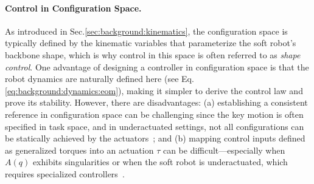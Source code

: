 \paragraph{Control in Configuration Space.}
As introduced in Sec.\ref{sec:background:kinematics}, the configuration space is typically defined by the kinematic variables that parameterize the soft robot’s backbone shape, which is why control in this space is often referred to as \emph{shape control}. One advantage of designing a controller in configuration space is that the robot dynamics are naturally defined here (see Eq.\ref{eq:background:dynamics:eom}), making it simpler to derive the control law and prove its stability. However, there are disadvantages: (a) establishing a consistent reference in configuration space can be challenging since the key motion is often specified in task space, and in underactuated settings, not all configurations can be statically achieved by the actuators~\citep{della2025pushing}; and (b) mapping control inputs defined as generalized torques into an actuation $\tau$ can be difficult—especially when $A(q)$ exhibits singularities or when the soft robot is underactuated, which requires specialized controllers~\citep{pustina2022feedback}.



